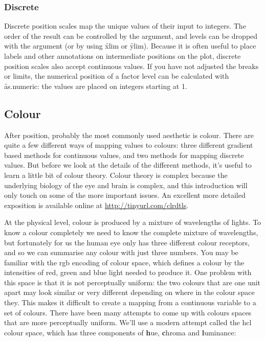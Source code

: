 \subsubsection{Discrete}
\label{sub:scale-discrete}

Discrete position scales map the unique values of their input to integers.  The order of the result can be controlled by the  argument, and levels can be dropped with the  argument (or by using \f{xlim} or \f{ylim}).  Because it is often useful to place labels and other annotations on intermediate positions on the plot, discrete position scales also accept continuous values.  If you have not adjusted the breaks or limits, the numerical position of a factor level can be calculated with \f{as.numeric}: the values are placed on integers starting at 1.


\subsection{Colour}
\label{sub:scale-colour}

After position, probably the most commonly used aesthetic is colour. There are quite a few different ways of mapping values to colours: three different gradient based methods for continuous values, and two methods for mapping discrete values. But before we look at the details of the different methods, it's useful to learn a little bit of colour theory. Colour theory is complex because the underlying biology of the eye and brain is complex, and this introduction will only touch on some of the more important issues. An excellent more detailed exposition is available online at \url{http://tinyurl.com/clrdtls}.

At the physical level, colour is produced by a mixture of wavelengths of lights. To know a colour completely we need to know the complete mixture of wavelengths, but fortunately for us the human eye only has three different colour receptors, and so we can summarise any colour with just three numbers. You may be familiar with the rgb encoding of colour space, which defines a colour by the intensities of red, green and blue light needed to produce it. One problem with this space is that it is not perceptually uniform: the two colours that are one unit apart may look similar or very different depending on where in the colour space they. This makes it difficult to create a mapping from a continuous variable to a set of colours.  There have been many attempts to come up with colours spaces that are more perceptually uniform.  We'll use a modern attempt called the hcl colour space, which has three components of {\bf h}ue, {\bf c}hroma and {\bf l}uminance:

